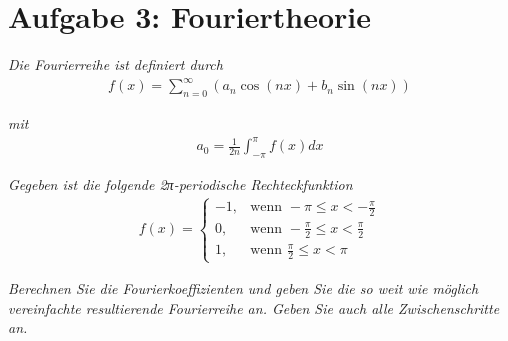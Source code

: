 \documentclass[
  ngerman,
  DIV=14
]{scrartcl}
\begin{document}
\section*{Aufgabe 3: Fouriertheorie}

\emph{Die Fourierreihe ist definiert durch}
\begin{align*}
  f(x) = \sum_{n=0}^{\infty} (a_n \cos(n x) + b_n \sin(n x))
\end{align*}

\emph{mit}
\begin{align*}
a_0 = \frac{1}{2n}\int_{-\pi}^{\pi} f(x) dx  
\end{align*}

\emph{Gegeben ist die folgende 2π-periodische Rechteckfunktion}
\begin{align*}
f(x) = \begin{cases}
  -1, & \text{wenn } -\pi \leq x < -\frac{\pi}{2}\\
  0, & \text{wenn } -\frac{\pi}{2} \leq x < \frac{\pi}{2}\\
  1, & \text{wenn } \frac{\pi}{2} \leq x < \pi
\end{cases} 
\end{align*}


\emph{Berechnen Sie die Fourierkoeffizienten und geben Sie die so weit wie möglich vereinfachte resultierende Fourierreihe an. Geben Sie auch alle Zwischenschritte an.}
\end{document}
